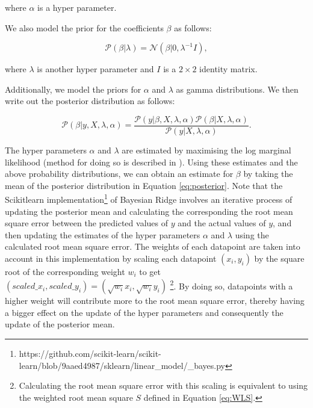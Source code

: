 \documentclass[11pt]{article}
\begin{document}
where $\alpha$ is a hyper parameter.

We also model the prior for the coefficients $\beta$ as follows:

\begin{equation}
	\label{eq:prior}
    \mathcal{P}(\beta | \lambda) = \mathcal{N}(\beta | 0, \lambda^{-1}I),
\end{equation}

where $\lambda$ is another hyper parameter and $I$ is a $2\times2$ identity matrix.

Additionally, we model the priors for $\alpha$ and $\lambda$ as gamma distributions. We then write out the posterior distribution as follows:

\begin{equation}
	\label{eq:posterior}
    \mathcal{P}(\beta | y,X,\lambda,\alpha) = \frac{\mathcal{P}(y | \beta, X, \lambda, \alpha)\mathcal{P}(\beta | X, \lambda, \alpha)}{\mathcal{P}(y | X, \lambda, \alpha)}.
\end{equation}

The hyper parameters $\alpha$ and $\lambda$ are estimated by maximising the log marginal likelihood (method for doing so is described in \cite{tipping2001sparse}). Using these estimates and the above probability distributions, we can obtain an estimate for $\beta$ by taking the mean of the posterior distribution in Equation \ref{eq:posterior}. Note that the Scikit\-learn implementation\footnote{https://github.com/scikit-learn/scikit-learn/blob/9aaed4987/sklearn/linear\_model/\_bayes.py} of Bayesian Ridge involves an iterative process of updating the posterior mean and calculating the corresponding the root mean square error between the predicted values of $y$ and the actual values of $y$, and then updating the estimates of the hyper parameters $\alpha$ and $\lambda$ using the calculated root mean square error. The weights of each datapoint are taken into account in this implementation by scaling each datapoint $(x_{i}, y_{i})$ by the square root of the corresponding weight $w_{i}$ to get $(scaled\_x_{i}, scaled\_y_{i}) = (\sqrt{w_{i}} x_{i}, \sqrt{w_{i}} y_{i})$ \footnote{Calculating the root mean square error with this scaling is equivalent to using the weighted root mean square $S$ defined in Equation \ref{eq:WLS}.}. By doing so, datapoints with a higher weight will contribute more to the root mean square error, thereby having a bigger effect on the update of the hyper parameters and consequently the update of the posterior mean.

\end{document}
